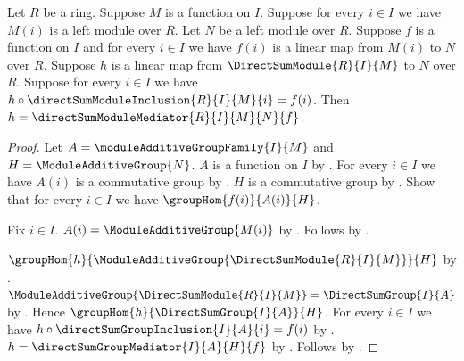 \begin{theorem}\label{direct_sum_module_mediator_unique}
    Let $R$ be a ring.
    Suppose $M$ is a function on $I$.
    Suppose for every $i\in I$ we have $M(i)$ is a left module over $R$.
    Let $N$ be a left module over $R$.
    Suppose $f$ is a function on $I$ and for every $i\in I$ we have
        $f(i)$ is a linear map from $M(i)$ to $N$ over $R$.
    Suppose $h$ is a linear map from $\DirectSumModule{R}{I}{M}$ to
        $N$ over $R$.
    Suppose for every $i\in I$ we have
        $h\circ\directSumModuleInclusion{R}{I}{M}{i}=f(i)$.
    Then $h=\directSumModuleMediator{R}{I}{M}{N}{f}$.
\end{theorem}
\begin{proof}
    Let $A=\moduleAdditiveGroupFamily{I}{M}$ and
        $H=\ModuleAdditiveGroup{N}$.
    $A$ is a function on $I$ by
        .
    For every $i\in I$ we have $A(i)$ is a commutative group by
        .
    $H$ is a commutative group by
        .
    Show that for every $i\in I$ we have $\groupHom{f(i)}{A(i)}{H}$.
    \begin{subproof}
        Fix $i\in I$.
        $A(i)=\ModuleAdditiveGroup{M(i)}$ by
            .
        Follows by .
    \end{subproof}
    $\groupHom{h}{\ModuleAdditiveGroup{\DirectSumModule{R}{I}{M}}}{H}$
        by .
    $\ModuleAdditiveGroup{\DirectSumModule{R}{I}{M}}
        =\DirectSumGroup{I}{A}$ by
        .
    Hence $\groupHom{h}{\DirectSumGroup{I}{A}}{H}$.
    For every $i\in I$ we have
        $h\circ\directSumGroupInclusion{I}{A}{i}=f(i)$ by
        .
    $h=\directSumGroupMediator{I}{A}{H}{f}$ by
        .
    Follows by .
\end{proof}
